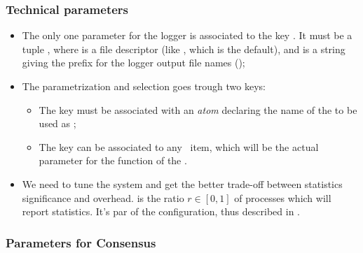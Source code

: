 \subsubsection{Technical parameters}
\label{subsub:ConfTechParams}

    \begin{itemize}

        \item   The only one parameter for the logger is associated to the
                key . It must be a tuple , where  is a file descriptor
                (like , which is the default), and
                 is a string giving the prefix for the
                logger output file names
                ();

        \item   The  parametrization and selection goes
                trough two keys:
            \begin{itemize}
                \item   The  key must be associated with an
                        \emph{atom} declaring the name of the
                         to be used as
                        ;
                \item   The 
                        key can be associated to any \Erlang\ item, which
                        will be the actual parameter for the
                         function of the .
            \end{itemize}

        \item   We need to tune the system and get the better trade-off
                between statistics significance and overhead.
                 is the ratio $r \in [0, 1]$ of processes
                which will report statistics. It's par of the
                 configuration, thus described in
                .

    \end{itemize}

\subsubsection{Parameters for Consensus}
\label{subsub:ConfConsParams}

